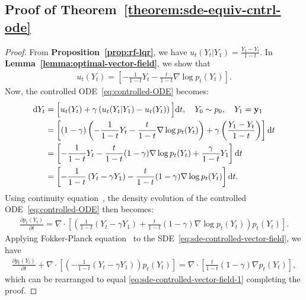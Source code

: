 \documentclass{article} %
\theoremstyle{plain}
\newcommand{\deriv}{\mathrm{d}}
\begin{document}
\subsection{Proof of Theorem~\ref{theorem:sde-equiv-cntrl-ode}}
\label{sec:proofs-thm-sde-equiv-cntrl-ode}
\begin{proof}
From \textbf{Proposition~\ref{prop:rf-lqr}}, we have $u_t(Y_t|Y_1) = \frac{Y_1 - Y_t}{1-t}$. In \textbf{Lemma~\ref{lemma:optimal-vector-field}}, we show that
\begin{align*}
    u_t(Y_t) = \left[ -\frac{1}{1-t}Y_t - \frac{t}{1-t} \nabla \log p_t(Y_t) \right].
\end{align*}
Now, the controlled ODE~\eqref{eq:controlled-ODE} becomes:
\begin{align*}
    \deriv Y_t 
    & = \Big[u_t(Y_t) + \gamma \left(u_t(Y_t|Y_1) - u_t(Y_t)\right) \Big] \deriv t, \quad Y_0 \sim p_0, \quad Y_1 = \rvy_1\\
    & =  \left[(1-\gamma)\left( -\frac{1}{1-t}Y_t - \frac{t}{1-t} \nabla \log p_t(Y_t)\right) + \gamma \left(\frac{Y_1 - Y_t}{1-t}\right)\right]\deriv t\\
    & =  \left[-\frac{1}{1-t}Y_t - \frac{t}{1-t} (1-\gamma)\nabla \log p_t(Y_t) + \frac{\gamma}{1-t}Y_1\right]\deriv t\\
    & =  \left[-\frac{1}{1-t}\left(Y_t - \gamma Y_1\right) - \frac{t}{1-t}(1-\gamma) \nabla \log p_t(Y_t)\right]\deriv t.
\end{align*}
Using continuity equation~\citep{oksendal2003stochastic}, the density evolution of the controlled ODE~\eqref{eq:controlled-ODE} then becomes:
\begin{align}
\label{eq:sde-controlled-vector-field-1}
    \frac{\partial p_t(Y_t)}{\partial t} = \nabla \cdot \left[\left( \frac{1}{1-t}\left(Y_t - \gamma Y_1\right) + \frac{t}{1-t} (1-\gamma)\nabla \log p_t(Y_t)\right)p_t(Y_t)\right].
\end{align}
Applying Fokker-Planck equation~\citep{oksendal2003stochastic} to the SDE~\eqref{eq:sde-controlled-vector-field}, we have
\begin{align*}
    \frac{\partial p_t(Y_t)}{\partial t} 
    + \nabla \cdot \left[\left(-\frac{1}{1-t}\left( Y_t -\gamma Y_1\right) \right) p_t(Y_t) \right] 
    = \nabla \cdot \left[ \frac{t}{1-t}(1-\gamma) \nabla p_t(Y_t)\right],
\end{align*}
which can be rearranged to equal \eqref{eq:sde-controlled-vector-field-1} completing the proof. 
\end{proof}
\end{document}
